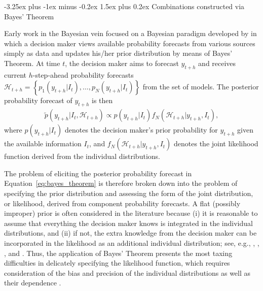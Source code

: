 \documentclass[11pt]{article}
\makeatletter
\renewcommand{\paragraph}{\@startsection{paragraph}{4}{0ex}%
   {-3.25ex plus -1ex minus -0.2ex}%
   {1.5ex plus 0.2ex}%
   {\normalfont\normalsize\bfseries}}
\makeatother
\begin{document}
\paragraph{Combinations constructed via Bayes' Theorem}

Early work in the Bayesian vein focused on a Bayesian paradigm developed by \citet{Morris1974-yh,Morris1977-xl} in which a decision maker views available probability forecasts from various sources simply as data and updates his/her prior distribution by means of Bayes' Theorem. At time $t$, the decision maker aims to forecast $y_{t+h}$ and receives current $h$-step-ahead probability forecasts $\mathcal{H}_{t+h} = \left\{p_{1}(y_{t+h}|I_{t}), \ldots, p_{N}(y_{t+h}|I_{t})\right\}$ from the set of models. The posterior probability forecast of $y_{t+h}$ is then
\begin{align}
\label{eq:bayes_theorem}
\tilde{p}\left(y_{t+h} | I_{t}, \mathcal{H}_{t+h}\right) \propto p\left(y_{t+h} | I_{t}\right) f_{N}\left(\mathcal{H}_{t+h} | y_{t+h}, I_{t}\right),
\end{align}
where $p\left(y_{t+h} | I_{t}\right)$ denotes the decision maker's prior probability for $y_{t+h}$ given the available information $I_{t}$, and $f_{N}\left(\mathcal{H}_{t+h} | y_{t+h}, I_{t}\right)$ denotes the joint likelihood function derived from the individual distributions.

The problem of eliciting the posterior probability forecast in Equation~\eqref{eq:bayes_theorem} is therefore broken down into the problem of specifying the prior distribution and assessing the form of the joint distribution, or likelihood, derived from component probability forecasts. A flat (possibly improper) prior is often considered in the literature because (i) it is reasonable to assume that everything the decision maker knows is integrated in the individual distributions, and (ii) if not, the extra knowledge from the decision maker can be incorporated in the likelihood as an additional individual distribution; see, e.g., \citet{Winkler1968-uw}, \citet{Clemen1993-ty}, \citet{Clemen1985-kx}, and \citet{Jouini1996-fe}. Thus, the application of Bayes' Theorem presents the most taxing difficulties in delicately specifying the likelihood function, which requires consideration of the bias and precision of the individual distributions as well as their dependence \citep{Hall2004-tm}.
\end{document}
